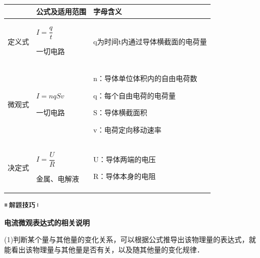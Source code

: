 \documentclass[cn,10.5pt,chinese,mac,chinesefont=founder]{elegantbook}
\begin{document}
\begin{longtable}[]{@{}m{1.5cm}m{4cm}m{6cm}@{}}
\toprule
& 公式及适用范围 & 字母含义\tabularnewline
\midrule
\endhead

定义式
& \begin{minipage}[t]{0.30\columnwidth}\raggedright
$I=\dfrac{q}{t}$

一切电路\strut
\end{minipage} & \begin{minipage}[t]{0.50\columnwidth}\raggedright
q为时间t内通过导体横截面的电荷量\strut
\end{minipage}\tabularnewline
\begin{minipage}[t]{0.30\columnwidth}\raggedright
微观式\strut
\end{minipage} & \begin{minipage}[t]{0.30\columnwidth}\raggedright
$I=nqSv$

一切电路\strut
\end{minipage} & \begin{minipage}[t]{0.50\columnwidth}\raggedright
n：导体单位体积内的自由电荷数

q：每个自由电荷的电荷量

S：导体横截面积

v：电荷定向移动速率\strut
\end{minipage}\tabularnewline
\begin{minipage}[t]{0.30\columnwidth}\raggedright
决定式\strut
\end{minipage} & \begin{minipage}[t]{0.30\columnwidth}\raggedright
$I=\dfrac{U}{R}$

金属、电解液\strut
\end{minipage} & \begin{minipage}[t]{0.50\columnwidth}\raggedright
U：导体两端的电压

R：导体本身的电阻\strut
\end{minipage}\tabularnewline
\bottomrule
\end{longtable}

\begin{center}\includegraphics[width=0.70764in,height=0.12292in]{media/image37.png}\end{center}
\begin{center}
	\textbf{电流微观表达式的相关说明}
\end{center}

(1)判断某个量与其他量的变化关系，可以根据公式推导出该物理量的表达式，就能看出该物理量与其他量是否有关，以及随其他量的变化规律．
\end{document}
